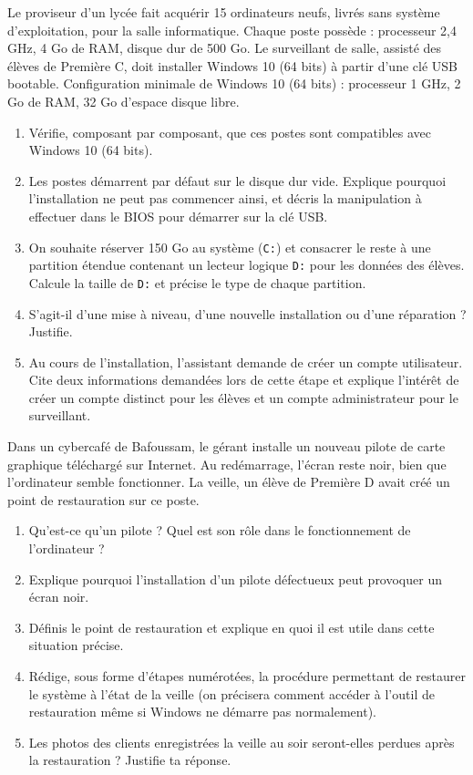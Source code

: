 \documentclass[11pt]{article}
\begin{document}
\begin{exercice}
Le proviseur d'un lycée fait acquérir 15 ordinateurs neufs, livrés sans système d'exploitation, pour la salle informatique. Chaque poste possède : processeur 2,4 GHz, 4 Go de RAM, disque dur de 500 Go. Le surveillant de salle, assisté des élèves de Première C, doit installer Windows 10 (64 bits) à partir d'une clé USB bootable. Configuration minimale de Windows 10 (64 bits) : processeur 1 GHz, 2 Go de RAM, 32 Go d'espace disque libre.
\begin{enumerate}
\item Vérifie, composant par composant, que ces postes sont compatibles avec Windows 10 (64 bits).
\item Les postes démarrent par défaut sur le disque dur vide. Explique pourquoi l'installation ne peut pas commencer ainsi, et décris la manipulation à effectuer dans le BIOS pour démarrer sur la clé USB.
\item On souhaite réserver 150 Go au système (\texttt{C:}) et consacrer le reste à une partition étendue contenant un lecteur logique \texttt{D:} pour les données des élèves. Calcule la taille de \texttt{D:} et précise le type de chaque partition.
\item S'agit-il d'une mise à niveau, d'une nouvelle installation ou d'une réparation ? Justifie.
\item Au cours de l'installation, l'assistant demande de créer un compte utilisateur. Cite deux informations demandées lors de cette étape et explique l'intérêt de créer un compte distinct pour les élèves et un compte administrateur pour le surveillant.
\end{enumerate}
\end{exercice}

\begin{exercice}
Dans un cybercafé de Bafoussam, le gérant installe un nouveau pilote de carte graphique téléchargé sur Internet. Au redémarrage, l'écran reste noir, bien que l'ordinateur semble fonctionner. La veille, un élève de Première D avait créé un point de restauration sur ce poste.
\begin{enumerate}
\item Qu'est-ce qu'un pilote ? Quel est son rôle dans le fonctionnement de l'ordinateur ?
\item Explique pourquoi l'installation d'un pilote défectueux peut provoquer un écran noir.
\item Définis le point de restauration et explique en quoi il est utile dans cette situation précise.
\item Rédige, sous forme d'étapes numérotées, la procédure permettant de restaurer le système à l'état de la veille (on précisera comment accéder à l'outil de restauration même si Windows ne démarre pas normalement).
\item Les photos des clients enregistrées la veille au soir seront-elles perdues après la restauration ? Justifie ta réponse.
\end{enumerate}
\end{exercice}
\end{document}
